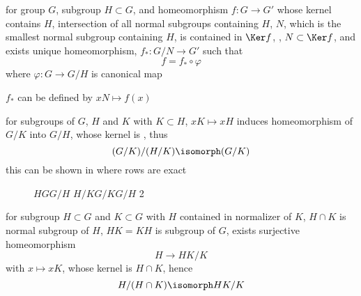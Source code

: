 \documentclass[17pt,landscape]{foils}
\begin{document}
{\item
	for group $G$,
	subgroup $H\subset G$,
	and
	homeomorphism $f:G\to G'$ whose kernel contains $H$,
	intersection of all normal subgroups containing $H$, $N$,
	which is the smallest normal subgroup containing $H$,
	is contained in $\Ker f$,
	\ie,
	$N\subset \Ker f$,
	and exists unique homeomorphism, $f_*:G/N\to G'$
	such that $$f = f_* \circ \varphi$$
	where $\varphi:G\to G/H$ is canonical map
	\bit
	\item
		$f_*$ can be defined by $xN\mapsto f(x)$
	\item
	\eit

\item
	for subgroups of $G$, $H$ and $K$ with $K\subset H$,
	$xK \mapsto xH$ induces homeomorphism of $G/K$ into $G/H$,
	whose kernel is ,
	thus %
		\
	$$
		(G/K)/(H/K) \isomorph (G/K)
	$$
	this can be shown in 
	where rows are exact

	\begin{figure}
	\begin{center}
		\largecommutativediagram{6em}%
		{$H$}{$G$}{$G/H$}%
		{$H/K$}{$G/K$}{$G/H$}%
		{2}
			\label{fig:commutative diagram for canonical isomorphism}
	\end{center}
	\end{figure}

\item
	for subgroup $H\subset G$ and $K\subset G$ with $H$ contained in normalizer of $K$,
	$H\cap K$ is normal subgroup of $H$,
	$HK=KH$ is subgroup of $G$,
	exists surjective homeomorphism
	$$
		H \to HK / K
	$$
	with $x \mapsto xK$,
	whose kernel is $H\cap K$,
	hence %
		\
	$$
		H/(H\cap K) \isomorph HK/K
	$$

}
\end{document}

